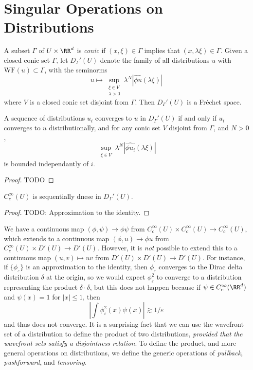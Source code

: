 \section{Singular Operations on Distributions}

A subset $\Gamma$ of $U \times \RR^d$ is \emph{conic} if $(x,\xi) \in \Gamma$ implies that $(x,\lambda \xi) \in \Gamma$. Given a closed conic set $\Gamma$, let $D_\Gamma'(U)$ denote the family of all distributions $u$ with $\text{WF}(u) \subset \Gamma$, with the seminorms
%
\[ u \mapsto \sup_{\substack{\xi \in V\\\lambda > 0}} \lambda^N |\widehat{\phi u}(\lambda \xi)| \]
%
where $V$ is a closed conic set disjoint from $\Gamma$. Then $D_\Gamma'(U)$ is a Fr\'{e}chet space.

\begin{theorem}
    A sequence of distributions $u_i$ converges to $u$ in $D_\Gamma'(U)$ if and only if $u_i$ converges to $u$ distributionally, and for any conic set $V$ disjoint from $\Gamma$, and $N > 0$,
    \[ \sup_{\substack{\xi \in V}} \lambda^N |\widehat{\phi u_i}(\lambda \xi)| \]
    is bounded independantly of $i$.
\end{theorem}
\begin{proof}
    TODO
\end{proof}

\begin{theorem}
    $C_c^\infty(U)$ is sequentially dnese in $D_\Gamma'(U)$.
\end{theorem}
\begin{proof}
    TODO: Approximation to the identity.
\end{proof}

We have a continuous map $(\phi,\psi) \to \phi \psi$ from $C_c^\infty(U) \times C_c^\infty(U) \to C_c^\infty(U)$, which extends to a continuous map $(\phi,u) \to \phi u$ from $C_c^\infty(U) \times D'(U) \to D'(U)$. However, it is \emph{not} possible to extend this to a continuous map $(u,v) \mapsto uv$ from $D'(U) \times D'(U) \to D'(U)$. For instance, if $\{ \phi_\varepsilon \}$ is an approximation to the identity, then $\phi_\varepsilon$ converges to the Dirac delta distribution $\delta$ at the origin, so we would expect $\phi_\varepsilon^2$ to converge to a distribution representing the product $\delta \cdot \delta$, but this does not happen because if $\psi \in C_c^\infty(\RR^d)$ and $\psi(x) = 1$ for $|x| \leq 1$, then
%
\[ \left| \int \phi_\varepsilon^2(x) \psi(x) \right| \gtrsim 1/\varepsilon \]
%
and thus does not converge. It is a surprising fact that we can use the wavefront set of a distribution to define the product of two distributions, \emph{provided that the wavefront sets satisfy a disjointness relation}. To define the product, and more general operations on distributions, we define the generic operations of \emph{pullback}, \emph{pushforward}, and \emph{tensoring}.

